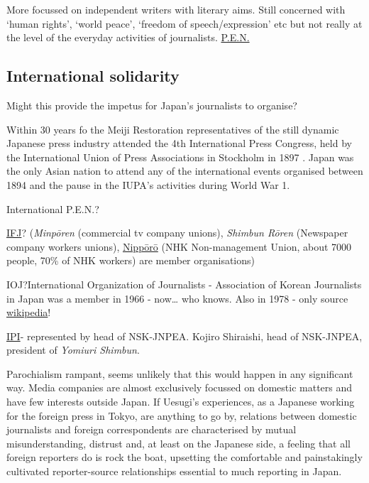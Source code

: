 \documentclass[11pt, headings=normal]{scrartcl}
\begin{document}
More focussed on independent writers with literary aims. Still concerned
with `human rights', `world peace', `freedom of speech/expression' etc
but not really at the level of the everyday activities of journalists.
\href{http://www.japanpen.or.jp/about/activity/}{P.E.N.}

\hypertarget{international-solidarity}{%
\subsection*{International solidarity}\label{international-solidarity}}

Might this provide the impetus for Japan's journalists to organise?

Within 30 years fo the Meiji Restoration representatives of the still
dynamic Japanese press industry attended the 4th International Press
Congress, held by the International Union of Press Associations in
Stockholm in 1897 \autocite[44--48]{Bjork:2016}. Japan was the only
Asian nation to attend any of the international events organised between
1894 and the pause in the IUPA's activities during World War 1.

International P.E.N.?

\href{http://www.ifj.org/en/members/asia-pacific/}{IFJ}?
(\emph{Minpōren} (commercial tv company unions), \emph{Shimbun Rōren}
(Newspaper company workers unions),
\href{http://www.nipporo.com/}{Nippōrō} (NHK Non-management Union, about
7000 people, 70\% of NHK workers) are member organisations)

IOJ?International Organization of Journalists - Association of Korean
Journalists in Japan was a member in 1966 - now\ldots{} who knows. Also
in 1978 - only source
\href{https://en.wikipedia.org/wiki/International_Organization_of_Journalists}{wikipedia}!

\href{http://ipi.media/national-committees/}{IPI}- represented by head
of NSK-JNPEA. Kojiro Shiraishi, head of NSK-JNPEA, president of
\emph{Yomiuri Shimbun}.

Parochialism rampant, seems unlikely that this would happen in any
significant way. Media companies are almost exclusively focussed on
domestic matters and have few interests outside Japan. If Uesugi's
experiences, as a Japanese working for the foreign press in Tokyo, are
anything to go by, relations between domestic journalists and foreign
correspondents are characterised by mutual misunderstanding, distrust
and, at least on the Japanese side, a feeling that all foreign reporters
do is rock the boat, upsetting the comfortable and painstakingly
cultivated reporter-source relationships essential to much reporting in
Japan. \textcite[92--8]{Uesugi:2008}
\end{document}
